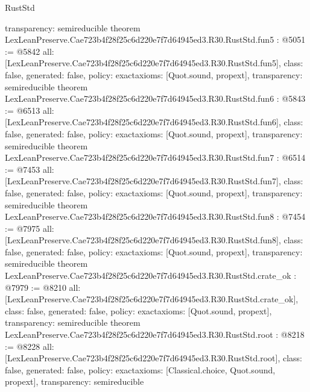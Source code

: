 \begin{lexlean}{RustStd}
\begin{coremodule}
{  transparency: semireducible
}
theorem LexLeanPreserve.Cae723b4f28f25c6d220e7f7d64945ed3.R30.RustStd.fun5 : @5051 := @5842 {
  all: [LexLeanPreserve.Cae723b4f28f25c6d220e7f7d64945ed3.R30.RustStd.fun5],
  class: false,
  generated: false,
  policy: exact{axioms: [Quot.sound, propext]},
  transparency: semireducible
}
theorem LexLeanPreserve.Cae723b4f28f25c6d220e7f7d64945ed3.R30.RustStd.fun6 : @5843 := @6513 {
  all: [LexLeanPreserve.Cae723b4f28f25c6d220e7f7d64945ed3.R30.RustStd.fun6],
  class: false,
  generated: false,
  policy: exact{axioms: [Quot.sound, propext]},
  transparency: semireducible
}
theorem LexLeanPreserve.Cae723b4f28f25c6d220e7f7d64945ed3.R30.RustStd.fun7 : @6514 := @7453 {
  all: [LexLeanPreserve.Cae723b4f28f25c6d220e7f7d64945ed3.R30.RustStd.fun7],
  class: false,
  generated: false,
  policy: exact{axioms: [Quot.sound, propext]},
  transparency: semireducible
}
theorem LexLeanPreserve.Cae723b4f28f25c6d220e7f7d64945ed3.R30.RustStd.fun8 : @7454 := @7975 {
  all: [LexLeanPreserve.Cae723b4f28f25c6d220e7f7d64945ed3.R30.RustStd.fun8],
  class: false,
  generated: false,
  policy: exact{axioms: [Quot.sound, propext]},
  transparency: semireducible
}
theorem LexLeanPreserve.Cae723b4f28f25c6d220e7f7d64945ed3.R30.RustStd.crate_ok : @7979 := @8210 {
  all: [LexLeanPreserve.Cae723b4f28f25c6d220e7f7d64945ed3.R30.RustStd.crate_ok],
  class: false,
  generated: false,
  policy: exact{axioms: [Quot.sound, propext]},
  transparency: semireducible
}
theorem LexLeanPreserve.Cae723b4f28f25c6d220e7f7d64945ed3.R30.RustStd.root : @8218 := @8228 {
  all: [LexLeanPreserve.Cae723b4f28f25c6d220e7f7d64945ed3.R30.RustStd.root],
  class: false,
  generated: false,
  policy: exact{axioms: [Classical.choice, Quot.sound, propext]},
  transparency: semireducible
}


\end{coremodule}
\end{lexlean}
